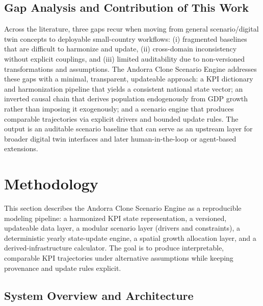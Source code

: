\documentclass{article}
\begin{document}
\subsection{Gap Analysis and Contribution of This Work}
Across the literature, three gaps recur when moving from general
scenario/digital twin concepts to deployable small-country workflows: (i)
fragmented baselines that are difficult to harmonize and update, (ii)
cross-domain inconsistency without explicit couplings, and (iii) limited
auditability due to non-versioned transformations and assumptions. The Andorra
Clone Scenario Engine addresses these gaps with a minimal, transparent,
updateable approach: a KPI dictionary and harmonization pipeline that yields a
consistent national state vector; an inverted causal chain that derives
population endogenously from GDP growth rather than imposing it exogenously;
and a scenario engine that produces comparable trajectories via
explicit drivers and bounded update rules. The output is an auditable scenario
baseline that can serve as an upstream layer for broader digital twin interfaces
and later human-in-the-loop or agent-based extensions.

\section{Methodology}
\label{sec:methodology}

This section describes the Andorra Clone Scenario Engine as a reproducible
modeling pipeline: a harmonized KPI state representation, a versioned,
updateable data layer, a modular scenario layer (drivers and constraints), a
deterministic yearly state-update engine, a spatial growth allocation layer,
and a derived-infrastructure calculator. The goal is to produce interpretable,
comparable KPI trajectories under alternative assumptions while keeping
provenance and update rules explicit.

\subsection{System Overview and Architecture}
\label{subsec:system_overview}
\end{document}
